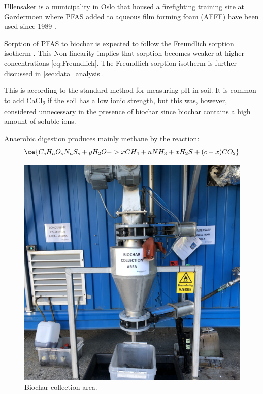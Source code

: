 Ullensaker is a municipality in Oslo that housed a firefighting training site at Gardermoen where PFAS added to aqueous film forming foam (AFFF) have been used since 1989 \citep{Hale2017fire}.

Sorption of PFAS to biochar is expected to follow the Freundlich sorption isotherm \citep{Hale2016, kupryianchyk2016biochar}. This Non-linearity implies that sorption becomes weaker at higher concentrations \cref{eq:Freundlich}. The Freundlich sorption isotherm is further discussed in \cref{sec:data_analysis}. 

This is according to the standard method for measuring pH in soil. It is common to add CaCl\textsubscript{2} if the soil has a low ionic strength, but this was, however, considered unnecessary in the presence of biochar since biochar contains a high amount of soluble ions. 

Anaerobic digestion produces mainly methane by the reaction: 
        \begin{equation}
        \label{eq:AD}
            \ce{C_cH_hO_oN_nS_s + yH_2O -> xCH_4 + nNH_3 + xH_2S + (c-x)CO_2}
        \end{equation}
        
\begin{figure}
    \centering
    \includegraphics[width=0.6\linewidth,scale=0.6]{Bilder/Pyrolysis/BiocharCollection.jpg}
    \caption{Biochar collection area.}
    \label{fig:biocharCollection}
\end{figure}

